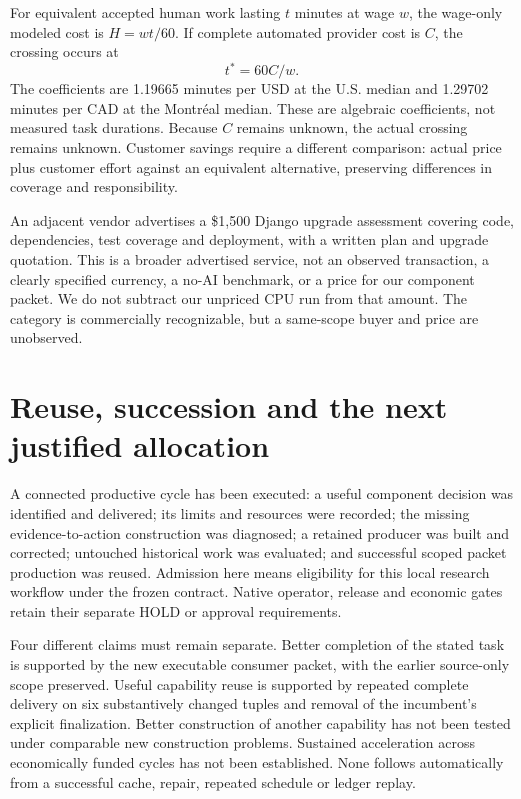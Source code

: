 \documentclass[11pt,a4paper]{article}
\begin{document}
For equivalent accepted human work lasting $t$ minutes at wage $w$, the wage-only modeled cost is $H=wt/60$. If complete automated provider cost is $C$, the crossing occurs at
\begin{equation}
t^*=60C/w.
\end{equation}
The coefficients are 1.19665 minutes per USD at the U.S. median and 1.29702 minutes per CAD at the Montr\'eal median. These are algebraic coefficients, not measured task durations. Because $C$ remains unknown, the actual crossing remains unknown. Customer savings require a different comparison: actual price plus customer effort against an equivalent alternative, preserving differences in coverage and responsibility.\cite{human,economics}

An adjacent vendor advertises a \$1,500 Django upgrade assessment covering code, dependencies, test coverage and deployment, with a written plan and upgrade quotation. This is a broader advertised service, not an observed transaction, a clearly specified currency, a no-AI benchmark, or a price for our component packet. We do not subtract our unpriced CPU run from that amount. The category is commercially recognizable, but a same-scope buyer and price are unobserved.\cite{netlandish}

\section{Reuse, succession and the next justified allocation}

A connected productive cycle has been executed: a useful component decision was identified and delivered; its limits and resources were recorded; the missing evidence-to-action construction was diagnosed; a retained producer was built and corrected; untouched historical work was evaluated; and successful scoped packet production was reused. Admission here means eligibility for this local research workflow under the frozen contract. Native operator, release and economic gates retain their separate HOLD or approval requirements.\cite{results,ecosystem}

Four different claims must remain separate. Better completion of the stated task is supported by the new executable consumer packet, with the earlier source-only scope preserved. Useful capability reuse is supported by repeated complete delivery on six substantively changed tuples and removal of the incumbent's explicit finalization. Better construction of another capability has not been tested under comparable new construction problems. Sustained acceleration across economically funded cycles has not been established. None follows automatically from a successful cache, repair, repeated schedule or ledger replay.
\end{document}
